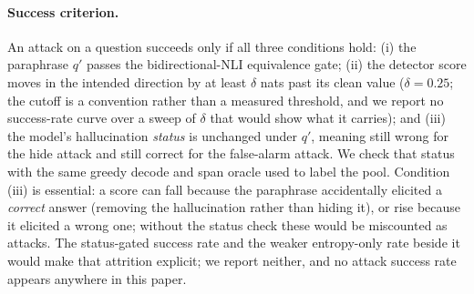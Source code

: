 \paragraph{Success criterion.}
An attack on a question succeeds only if all three conditions hold: (i) the
paraphrase $q'$ passes the bidirectional-NLI equivalence gate; (ii) the detector
score moves in the intended direction by at least $\delta$ nats past its clean
value ($\delta{=}0.25$; the cutoff is a convention rather than a measured threshold, and we
report no success-rate curve over a sweep of $\delta$ that would show what it carries); and
(iii) the model's hallucination \emph{status} is unchanged under
$q'$, meaning still wrong for the hide attack and still correct for the false-alarm
attack. We check that status with the same greedy decode and span oracle used to label the
pool. Condition (iii) is essential: a score can fall because the paraphrase
accidentally elicited a \emph{correct} answer (removing the hallucination rather
than hiding it), or rise because it elicited a wrong one; without the status
check these would be miscounted as attacks. The status-gated success rate and the weaker
entropy-only rate beside it would make that attrition explicit; we report neither, and no
attack success rate appears anywhere in this paper.

